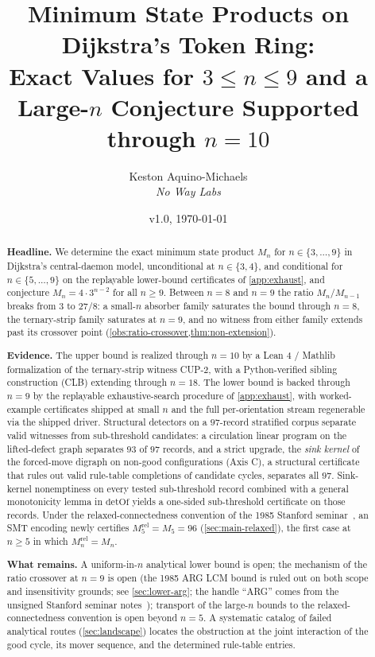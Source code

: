 \documentclass[11pt,a4paper]{article}
\title{Minimum State Products on Dijkstra's Token Ring:\\
       Exact Values for $3 \le n \le 9$ and a Large-$n$ Conjecture
       Supported through $n = 10$}
\author{Keston Aquino-Michaels\\
        \emph{No Way Labs}}
\date{v1.0, \today}
\theoremstyle{plain}
\theoremstyle{definition}
\newcommand{\Mn}{M_n}
\newcommand{\detOf}{\mathrm{detOf}}
\begin{document}
\maketitle

\begin{abstract}
\noindent\textbf{Headline.} We determine the exact minimum state
product $\Mn$ for $n \in \{3, \ldots, 9\}$ in Dijkstra's
central-daemon model, unconditional at $n \in \{3, 4\}$, and
conditional for $n \in \{5, \ldots, 9\}$ on the replayable
lower-bound certificates of \cref{app:exhaust}, and conjecture
$\Mn = 4 \cdot 3^{n-2}$ for all $n \ge 9$.  Between $n = 8$ and
$n = 9$ the ratio $\Mn / M_{n-1}$ breaks from $3$ to $27/8$: a
small-$n$ absorber family saturates the bound through $n = 8$, the
ternary-strip family saturates at $n = 9$, and no witness from
either family extends past its crossover point
(\cref{obs:ratio-crossover,thm:non-extension}).

\medskip\noindent\textbf{Evidence.} The upper bound is realized
through $n = 10$ by a Lean 4 / Mathlib formalization of the
ternary-strip witness CUP-2, with a Python-verified sibling
construction (CLB) extending
through $n = 18$.  The lower bound is backed through $n = 9$ by
the replayable exhaustive-search procedure of \cref{app:exhaust},
with worked-example certificates shipped at small $n$ and the
full per-orientation stream regenerable via the shipped driver.  Structural
detectors on a $97$-record stratified corpus separate valid
witnesses from sub-threshold candidates: a circulation linear
program on the lifted-defect graph separates $93$ of $97$ records,
and a strict upgrade, the \emph{sink kernel} of the forced-move
digraph on non-good configurations (Axis C), a structural
certificate that rules out valid rule-table completions of
candidate cycles, separates all $97$.  Sink-kernel nonemptiness
on every tested sub-threshold record combined with a general
monotonicity lemma in $\detOf$ yields a one-sided sub-threshold
certificate on those records.  Under the relaxed-connectedness
convention of the 1985 Stanford seminar~\cite{HaddadKnuth1985}, an
SMT encoding newly certifies $M_5^{\mathrm{rel}} = M_5 = 96$
(\cref{sec:main-relaxed}), the first case at $n \ge 5$ in which
$M_n^{\mathrm{rel}} = M_n$.

\medskip\noindent\textbf{What remains.} A uniform-in-$n$
analytical lower bound is open; the mechanism of the ratio
crossover at $n = 9$ is open (the 1985 ARG LCM bound is ruled
out on both scope and insensitivity grounds; see
\cref{sec:lower-arg}; the handle ``ARG'' comes from the unsigned
Stanford seminar notes~\cite[\S2--\S3]{HaddadKnuth1985});
transport of the large-$n$ bounds to the relaxed-connectedness
convention is open beyond $n = 5$.  A systematic catalog of failed
analytical routes (\cref{sec:landscape}) locates the obstruction at
the joint interaction of the good cycle, its mover sequence, and
the determined rule-table entries.
\end{abstract}
\end{document}
